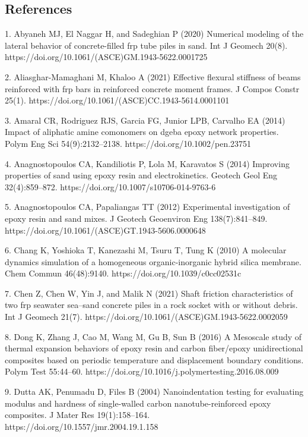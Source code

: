 \documentclass{article}
\begin{document}
\subsection*{References}

\begin{hangpars}
1. Abyaneh MJ, El Naggar H, and Sadeghian P (2020) Numerical modeling of the lateral behavior of concrete-filled frp tube piles in sand. Int J Geomech 20(8). https://doi.org/10.1061/(ASCE)GM.1943-5622.0001725

2. Aliasghar-Mamaghani M, Khaloo A (2021) Effective flexural stiffness of beams reinforced with frp bars in reinforced concrete moment frames. J Compos Constr 25(1). https://doi.org/10.1061/(ASCE)CC.1943-5614.0001101

3. Amaral CR, Rodriguez RJS, Garcia FG, Junior LPB, Carvalho EA (2014) Impact of aliphatic amine comonomers on dgeba epoxy network properties. Polym Eng Sci 54(9):2132–2138. https://doi.org/10.1002/pen.23751

4. Anagnostopoulos CA, Kandiliotis P, Lola M, Karavatos S (2014) Improving properties of sand using epoxy resin and electrokinetics. Geotech Geol Eng 32(4):859–872. https://doi.org/10.1007/s10706-014-9763-6

5. Anagnostopoulos CA, Papaliangas TT (2012) Experimental investigation of epoxy resin and sand mixes. J Geotech Geoenviron Eng 138(7):841–849. https://doi.org/10.1061/(ASCE)GT.1943-5606.0000648

6. Chang K, Yoshioka T, Kanezashi M, Tsuru T, Tung K (2010) A molecular dynamics simulation of a homogeneous organic-inorganic hybrid silica membrane. Chem Commun 46(48):9140. https://doi.org/10.1039/c0cc02531c

7. Chen Z, Chen W, Yin J, and Malik N (2021) Shaft friction characteristics of two frp seawater sea–sand concrete piles in a rock socket with or without debris. Int J Geomech 21(7). https://doi.org/10.1061/(ASCE)GM.1943-5622.0002059

8. Dong K, Zhang J, Cao M, Wang M, Gu B, Sun B (2016) A Mesoscale study of thermal expansion behaviors of epoxy resin and carbon fiber/epoxy unidirectional composites based on periodic temperature and displacement boundary conditions. Polym Test 55:44–60. https://doi.org/10.1016/j.polymertesting.2016.08.009

9. Dutta AK, Penumadu D, Files B (2004) Nanoindentation testing for evaluating modulus and hardness of single-walled carbon nanotube-reinforced epoxy composites. J Mater Res 19(1):158–164. https://doi.org/10.1557/jmr.2004.19.1.158


\end{hangpars}
\end{document}
